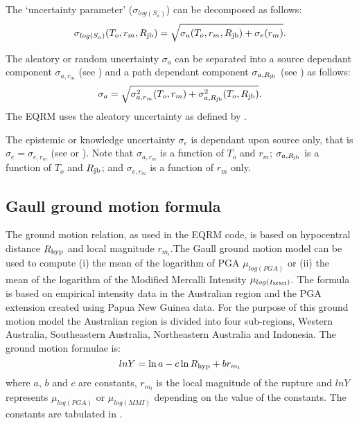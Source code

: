 The `uncertainty parameter' ($\sigma_{log(S_a)}$) can be
decomposed as follows:
\begin{equation}
 \sigma_{log(S_a)}(T_o,r_m,\Rjb) =
 \sqrt{\sigma_a(T_o,r_m,\Rjb)+\sigma_e(r_m)}.
\end{equation}

The aleatory or random uncertainty $\sigma_a$ can be separated
into a source dependant component $\sigma_{a,r_m}$ (see
\citet[Table 3]{dr_Toro97a}) and a path dependant
component $\sigma_{a,\Rjb}$ (see \citet[Table 4]{dr_Toro97a}) as follows:
\begin{equation}
\label{eq:attn-toro-aleat} \sigma_a =
\sqrt{\sigma_{a,r_m}^2(T_o,r_m) + \sigma_{a,\Rjb}^2(T_o,\Rjb)}.
\end{equation}
The EQRM uses the aleatory uncertainty as defined by
.

The epistemic or knowledge uncertainty $\sigma_e$ is dependant
upon source only, that is \mbox{$\sigma_e =\sigma_{e,r_m}$} (see
\citet[Page 48]{dr_Toro97a} or
). Note that
$\sigma_{a,r_m}$ is a function of $T_o$ and $r_m$;
$\sigma_{a,\Rjb}$ is a function of $T_o$ and $\Rjb$; and
$\sigma_{e,r_m}$ is a function of $r_m$ only.

\subsection{Gaull ground motion formula}
\label{attn:atten-formula-Gaull}


The \citet{dr_Gaull90a} ground motion relation, as used in the EQRM
code, is based on hypocentral distance $\Rhyp$ and local magnitude
$r_{m_l}$.The Gaull ground motion model can be used to compute (i)
the mean of the logarithm of PGA $\mu_{log(PGA)}$ or (ii) the mean
of the logarithm of the Modified Mercalli Intensity
$\mu_{log(\Imm)}$. The formula is based on empirical intensity
data in the Australian region and the PGA extension created using
Papua New Guinea data. For the purpose of this ground motion model
the Australian region is divided into four sub-regions, Western
Australia, Southeastern Australia, Northeastern Australia and
Indonesia. The ground motion formulae is:
\begin{equation}
lnY = \ln a-c\ln \Rhyp + br_{m_l}
\end{equation}
where $a$, $b$ and $c$ are constants, $r_{m_l}$ is the local
magnitude of the rupture and $lnY$ represents $\mu_{log(PGA)}$ or
$\mu_{log(MMI)}$ depending on the value of the constants. The
constants are tabulated in \citet[Table 4]{dr_Gaull90a}.


